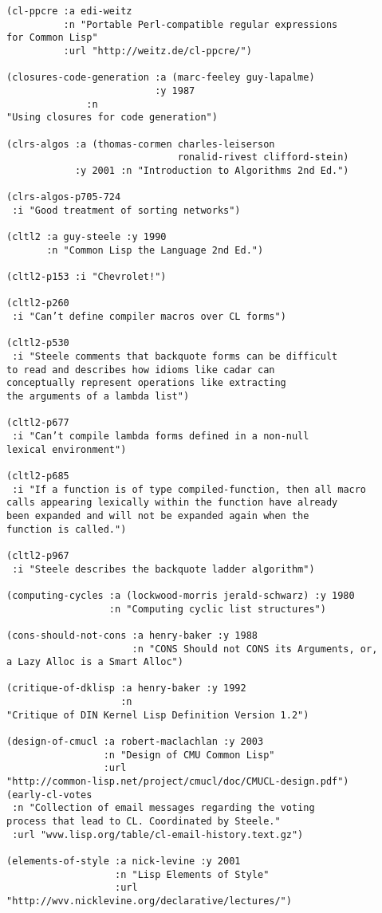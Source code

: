 \begin{verbatim}
(cl-ppcre :a edi-weitz
          :n "Portable Perl-compatible regular expressions
for Common Lisp"
          :url "http://weitz.de/cl-ppcre/")

(closures-code-generation :a (marc-feeley guy-lapalme)
                          :y 1987
			  :n
"Using closures for code generation")

(clrs-algos :a (thomas-cormen charles-leiserson
                              ronalid-rivest clifford-stein)
            :y 2001 :n "Introduction to Algorithms 2nd Ed.")

(clrs-algos-p705-724
 :i "Good treatment of sorting networks")

(cltl2 :a guy-steele :y 1990
       :n "Common Lisp the Language 2nd Ed.")

(cltl2-p153 :i "Chevrolet!")

(cltl2-p260
 :i "Can’t define compiler macros over CL forms")

(cltl2-p530
 :i "Steele comments that backquote forms can be difficult
to read and describes how idioms like cadar can
conceptually represent operations like extracting
the arguments of a lambda list")

(cltl2-p677
 :i "Can’t compile lambda forms defined in a non-null
lexical environment")

(cltl2-p685
 :i "If a function is of type compiled-function, then all macro
calls appearing lexically within the function have already
been expanded and will not be expanded again when the
function is called.")

(cltl2-p967
 :i "Steele describes the backquote ladder algorithm")

(computing-cycles :a (lockwood-morris jerald-schwarz) :y 1980
                  :n "Computing cyclic list structures")

(cons-should-not-cons :a henry-baker :y 1988
                      :n "CONS Should not CONS its Arguments, or,
a Lazy Alloc is a Smart Alloc")

(critique-of-dklisp :a henry-baker :y 1992
                    :n
"Critique of DIN Kernel Lisp Definition Version 1.2")

(design-of-cmucl :a robert-maclachlan :y 2003
                 :n "Design of CMU Common Lisp"
                 :url
"http://common-lisp.net/project/cmucl/doc/CMUCL-design.pdf")
(early-cl-votes
 :n "Collection of email messages regarding the voting
process that lead to CL. Coordinated by Steele."
 :url "wvw.lisp.org/table/cl-email-history.text.gz")

(elements-of-style :a nick-levine :y 2001
                   :n "Lisp Elements of Style"
                   :url
"http://wvv.nicklevine.org/declarative/lectures/")


\end{verbatim}
